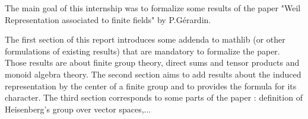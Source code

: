 The main goal of this internship was to formalize some results of the paper
"Weil Representation associated to finite fields" by P.Gérardin.
\newline

The first section of this report introduces some addenda to mathlib (or other
formulations of existing results) that are mandatory to formalize the paper.
Those results are about finite group theory, direct sums and tensor products
and monoid algebra theory.
\newline
The second section aims to add results about the induced representation by 
the center of a finite group and to provides the formula for its character.
\newline
The third section corresponds to some parts of the paper : definition
of Heisenberg's group over vector spaces,...
